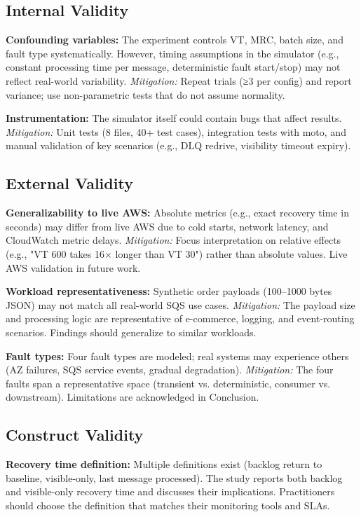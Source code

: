 \subsection{Internal Validity}

\textbf{Confounding variables:} The experiment controls VT, MRC, batch size, and fault type systematically. However, timing assumptions in the simulator (e.g., constant processing time per message, deterministic fault start/stop) may not reflect real-world variability. \emph{Mitigation:} Repeat trials (≥3 per config) and report variance; use non-parametric tests that do not assume normality.

\textbf{Instrumentation:} The simulator itself could contain bugs that affect results. \emph{Mitigation:} Unit tests (8 files, 40+ test cases), integration tests with moto, and manual validation of key scenarios (e.g., DLQ redrive, visibility timeout expiry).

\subsection{External Validity}

\textbf{Generalizability to live AWS:} Absolute metrics (e.g., exact recovery time in seconds) may differ from live AWS due to cold starts, network latency, and CloudWatch metric delays. \emph{Mitigation:} Focus interpretation on relative effects (e.g., "VT 600 takes 16× longer than VT 30") rather than absolute values. Live AWS validation in future work.

\textbf{Workload representativeness:} Synthetic order payloads (100–1000 bytes JSON) may not match all real-world SQS use cases. \emph{Mitigation:} The payload size and processing logic are representative of e-commerce, logging, and event-routing scenarios. Findings should generalize to similar workloads.

\textbf{Fault types:} Four fault types are modeled; real systems may experience others (AZ failures, SQS service events, gradual degradation). \emph{Mitigation:} The four faults span a representative space (transient vs. deterministic, consumer vs. downstream). Limitations are acknowledged in Conclusion.

\subsection{Construct Validity}

\textbf{Recovery time definition:} Multiple definitions exist (backlog return to baseline, visible-only, last message processed). The study reports both backlog and visible-only recovery time and discusses their implications. Practitioners should choose the definition that matches their monitoring tools and SLAs.


